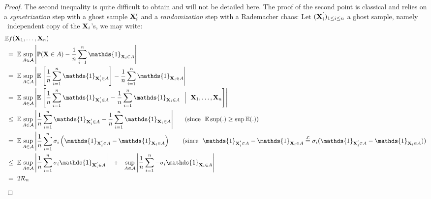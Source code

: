 \begin{proof}
The second inequality is quite difficult to obtain and will not be detailed here. %
The proof of the second point is classical and relies on a \emph{symetrization} step with a ghost sample $\mathbf X_i'$ and a \emph{randomization} step with a Rademacher chaos:
Let $(\mathbf X_i^{'})_{1 \le i \le n}$ a ghost sample, namely \iid~independent copy of the $\mathbf X_i$'s, we may write:
\begin{align*}
&\mathbb{E} f(\mb X_1,\ldots,\mb X_n) \\
&~=~ \mathbb{E} \sup_{A \in \mathcal{A}} \left | \mathbb{P}(\mb X \in A) - \frac{1}{n} \sum_{i=1}^{n}\mathds{1}_{\mb X_i \in A} \right| \\
&~=~ \mathbb{E} \sup_{A \in \mathcal{A}} \left | \mathbb{E}\left [ \frac{1}{n} \sum_{i=1}^{n}\mathds{1}_{\mb X_i^{'} \in A}\right] - \frac{1}{n} \sum_{i=1}^{n}\mathds{1}_{\mb X_i \in A} \right|\\
&~=~ \mathbb{E} \sup_{A \in \mathcal{A}} \left | \mathbb{E}\left [ \frac{1}{n} \sum_{i=1}^{n}\mathds{1}_{\mb X_i^{'} \in A} - \frac{1}{n} \sum_{i=1}^{n}\mathds{1}_{\mb X_i \in A} ~~\Big|~~ \mb X_1,\ldots,\mb X_n \right]\right|\\
&~\le~ \mathbb{E} \sup_{A \in \mathcal{A}} \left | \frac{1}{n} \sum_{i=1}^{n}\mathds{1}_{\mb X_i^{'} \in A} - \frac{1}{n} \sum_{i=1}^{n}\mathds{1}_{\mb X_i \in A} \right| ~~~~~(\text{since~~} \mathbb{E} \sup(.) \ge \sup \mathbb{E}(.) ) \\ 
&~=~ \mathbb{E} \sup_{A \in \mathcal{A}} \left |\frac{1}{n} \sum_{i=1}^{n} \sigma_i \left ( \mathds{1}_{\mb X_i^{'} \in A} - \mathds{1}_{\mb X_i \in A} \right) \right| ~~~~~(\text{since~~} \mathds{1}_{\mb X_i^{'} \in A} - \mathds{1}_{\mb X_i \in A} \overset{\mathcal{L}}{=} \sigma_i(\mathds{1}_{\mb X_i^{'} \in A} - \mathds{1}_{\mb X_i \in A}) )  \\
&~\le~\mathbb{E} \sup_{A \in \mathcal{A}} \left |\frac{1}{n} \sum_{i=1}^{n} \sigma_i \mathds{1}_{\mb X_i^{'} \in A}  \right| ~~+~~ \sup_{A \in \mathcal{A}} \left |\frac{1}{n} \sum_{i=1}^{n} -\sigma_i \mathds{1}_{\mb X_i \in A}  \right|\\
&~=~ 2 \mathcal{R}_n
\end{align*}
\end{proof}

